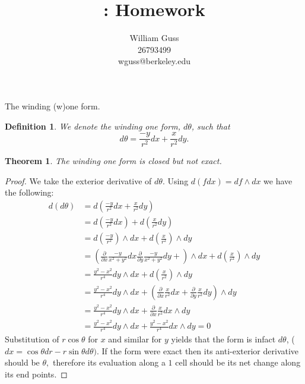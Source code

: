 \documentclass[letter]{article}
\title{\bCLASS: Homework \bHWN}
\author{William Guss\\26793499\\wguss@berkeley.edu}
\newtheorem{theorem}{Theorem}
\newtheorem{definition}{Definition}
\newenvironment{menumerate}{%
  \edef\backupindent{\the\parindent}%
  \enumerate%
  \setlength{\parindent}{\backupindent}%
}{\endenumerate}
\begin{document}
\maketitle
\thispagestyle{empty}


\begin{menumerate}
\setcounter{enumi}{64}
\item The winding (w)one form.
\begin{definition}
	We denote the winding one form, $d\theta$, such that
	\begin{equation}
		d\theta = \frac{-y}{r^2}dx + \frac{x}{r^2}dy.
	\end{equation}
\end{definition}
\begin{theorem}
	The winding one form is closed but not exact.
\end{theorem}
\begin{proof}
	We take the exterior derivative of $d\theta$. Using $d(fdx) = df \wedge dx$ we have the following:
	\begin{equation}
	\begin{aligned}
		d(d\theta) &= d\left(\frac{-y}{r^2}dx + \frac{x}{r^2}dy\right)\\
			&= d\left(\frac{-y}{r^2}dx\right) + d\left(\frac{x}{r^2}dy\right)\\
			&= d\left(\frac{-y}{r^2}\right) \wedge dx + d\left(\frac{x}{r^2}\right)
			\wedge dy \\
			&= \left(\frac{\partial}{\partial x}\frac{-y}{x^2+y^2}dx \frac{\partial}{\partial y}\frac{-y}{x^2+y^2}dy + \right) \wedge dx + d\left(\frac{x}{r^2}\right)
			\wedge dy \\
			&= \frac{y^2 -x^2}{r^4}dy \wedge dx + d\left(\frac{x}{r^2}\right) \wedge dy \\
			&= \frac{y^2 -x^2}{r^4}dy \wedge dx + \left(\frac{\partial}{\partial x}\frac{x}{r^2}dx + \frac{\partial}{\partial y} \frac{x}{r^2} dy\right) \wedge dy \\
			&= \frac{y^2 -x^2}{r^4}dy \wedge dx + \frac{\partial}{\partial x}\frac{x}{r^2}dx \wedge dy \\
			&= \frac{y^2 -x^2}{r^4}dy \wedge dx + \frac{y^2 - x^2}{r^4}dx \wedge dy = 0
	\end{aligned}	
	\end{equation}
	Substitution of $r\cos\theta$ for $x$ and similar for $y$ yields that the form is infact $d\theta$,  ($dx = \cos \theta dr - r\sin \theta d \theta).$ If the form were exact then its anti-exterior derivative should be $\theta,$ therefore its evaluation along a $1$ cell should be its net change along its end points.
	

\end{proof}
\end{menumerate}
\end{document}

